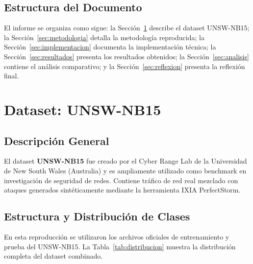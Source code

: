 \documentclass[12pt,a4paper]{article}
\begin{document}
\subsection{Estructura del Documento}

El informe se organiza como sigue: la Sección~\ref{sec:dataset} describe el dataset UNSW-NB15;
la Sección~\ref{sec:metodologia} detalla la metodología reproducida; la Sección~\ref{sec:implementacion}
documenta la implementación técnica; la Sección~\ref{sec:resultados} presenta los resultados obtenidos;
la Sección~\ref{sec:analisis} contiene el análisis comparativo; y la Sección~\ref{sec:reflexion}
presenta la reflexión final.

\section{Dataset: UNSW-NB15}
\label{sec:dataset}

\subsection{Descripción General}

El dataset \textbf{UNSW-NB15} fue creado por el Cyber Range Lab de la Universidad de New South
Wales (Australia) y es ampliamente utilizado como benchmark en investigación de seguridad de redes.
Contiene tráfico de red real mezclado con ataques generados sintéticamente mediante la herramienta
IXIA PerfectStorm.

\subsection{Estructura y Distribución de Clases}

En esta reproducción se utilizaron los archivos oficiales de entrenamiento y prueba del UNSW-NB15.
La Tabla~\ref{tab:distribucion} muestra la distribución completa del dataset combinado.
\end{document}

